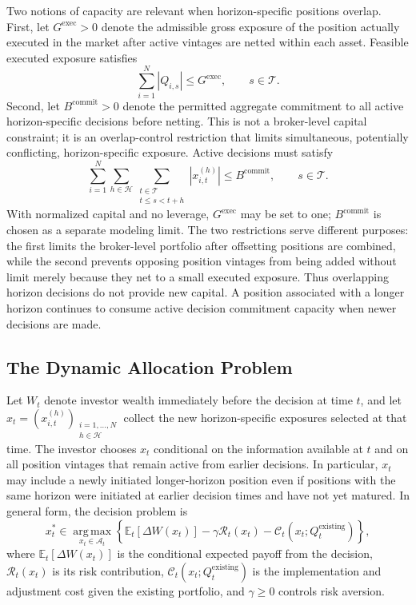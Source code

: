 \documentclass{article}
\begin{document}
Two notions of capacity are relevant when horizon-specific positions
overlap. First, let $G^{\mathrm{exec}}>0$ denote the admissible gross
exposure of the position actually executed in the market after active
vintages are netted within each asset. Feasible executed exposure
satisfies
\[
    \sum_{i=1}^{N} \left|Q_{i,s}\right| \leq G^{\mathrm{exec}},
    \qquad s \in \mathcal{T}.
\]
Second, let $B^{\mathrm{commit}}>0$ denote the permitted aggregate
commitment to all active horizon-specific decisions before netting.
This is not a broker-level capital constraint; it is an overlap-control
restriction that limits simultaneous, potentially conflicting,
horizon-specific exposure. Active decisions must satisfy
\[
    \sum_{i=1}^{N}
    \sum_{h \in \mathcal{H}}
    \sum_{\substack{t \in \mathcal{T} \\ t \leq s < t+h}}
    \left|x_{i,t}^{(h)}\right|
    \leq B^{\mathrm{commit}},
    \qquad s \in \mathcal{T}.
\]
With normalized capital and no leverage, $G^{\mathrm{exec}}$ may be set
to one; $B^{\mathrm{commit}}$ is chosen as a separate modeling limit.
The two restrictions serve different purposes: the first limits the
broker-level portfolio after offsetting positions are combined, while
the second prevents opposing position vintages from being added without
limit merely because they net to a small executed exposure.
Thus overlapping horizon decisions do not provide new capital. A
position associated with a longer horizon continues to consume active
decision commitment capacity when newer decisions are made.

\subsection{The Dynamic Allocation Problem}

Let $W_t$ denote investor wealth immediately before the decision at time
$t$, and let
$
    x_t =
    \left(x_{i,t}^{(h)}\right)_
    {\substack{i=1,\ldots,N \\ h \in \mathcal{H}}}
$
collect the new horizon-specific exposures selected at that time. The
investor chooses $x_t$ conditional on the information available at
$t$ and on all position vintages that remain active from earlier
decisions. In particular, $x_t$ may include a newly initiated
longer-horizon position even if positions with the same horizon were
initiated at earlier decision times and have not yet matured.
In general form, the decision problem is
\[
    x_t^*
    \in
    \underset{x_t \in \mathcal{A}_t}{\operatorname{arg\,max}}
    \left\{
        \mathbb{E}_t\!\left[\Delta W(x_t)\right]
        -
        \gamma \mathcal{R}_t(x_t)
        -
        \mathcal{C}_t(x_t;Q_t^{\mathrm{existing}})
    \right\},
\]
where $\mathbb{E}_t[\Delta W(x_t)]$ is the conditional expected payoff
from the decision, $\mathcal{R}_t(x_t)$ is its risk contribution,
$\mathcal{C}_t(x_t;Q_t^{\mathrm{existing}})$ is the implementation and
adjustment cost given the existing portfolio, and $\gamma \geq 0$
controls risk aversion.
\end{document}
